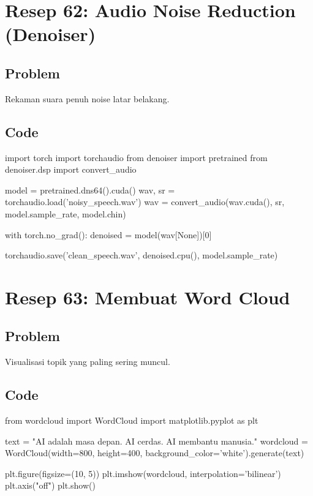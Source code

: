 \newpage

\section{Resep 62: Audio Noise Reduction (Denoiser)}

\subsection*{Problem}
Rekaman suara penuh noise latar belakang.

\subsection*{Code}
\begin{codeblock}[language=Python]
import torch
import torchaudio
from denoiser import pretrained
from denoiser.dsp import convert_audio

model = pretrained.dns64().cuda()
wav, sr = torchaudio.load('noisy_speech.wav')
wav = convert_audio(wav.cuda(), sr, model.sample_rate, model.chin)

with torch.no_grad():
    denoised = model(wav[None])[0]

torchaudio.save('clean_speech.wav', denoised.cpu(), model.sample_rate)
\end{codeblock}

\newpage

\section{Resep 63: Membuat Word Cloud}

\subsection*{Problem}
Visualisasi topik yang paling sering muncul.

\subsection*{Code}
\begin{codeblock}[language=Python]
from wordcloud import WordCloud
import matplotlib.pyplot as plt

text = "AI adalah masa depan. AI cerdas. AI membantu manusia."
wordcloud = WordCloud(width=800, height=400, background_color='white').generate(text)

plt.figure(figsize=(10, 5))
plt.imshow(wordcloud, interpolation='bilinear')
plt.axis("off")
plt.show()
\end{codeblock}

